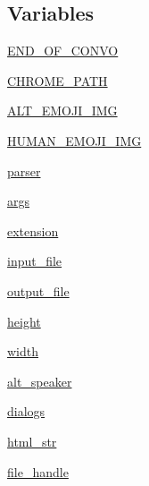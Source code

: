 \subsection*{Variables}
\begin{DoxyCompactItemize}
\item 
\hyperlink{namespaceparlai_1_1scripts_1_1convo__render_a186fc1cd3b5dd1020b696e3be2603c50}{E\+N\+D\+\_\+\+O\+F\+\_\+\+C\+O\+N\+VO}
\item 
\hyperlink{namespaceparlai_1_1scripts_1_1convo__render_acb4e8a35b4d515d9b39c046e912d2062}{C\+H\+R\+O\+M\+E\+\_\+\+P\+A\+TH}
\item 
\hyperlink{namespaceparlai_1_1scripts_1_1convo__render_ac3b8adcfe45607c534410d9c58c1a5f9}{A\+L\+T\+\_\+\+E\+M\+O\+J\+I\+\_\+\+I\+MG}
\item 
\hyperlink{namespaceparlai_1_1scripts_1_1convo__render_abdfd57c616188c807378cdd5ac001d47}{H\+U\+M\+A\+N\+\_\+\+E\+M\+O\+J\+I\+\_\+\+I\+MG}
\item 
\hyperlink{namespaceparlai_1_1scripts_1_1convo__render_a295851512271556f39c59b047dfbc8fc}{parser}
\item 
\hyperlink{namespaceparlai_1_1scripts_1_1convo__render_a784f93916e4d1bdb5c70adbfb1e29e69}{args}
\item 
\hyperlink{namespaceparlai_1_1scripts_1_1convo__render_ad4908cb1d2c44e6105115f3c09eb3a55}{extension}
\item 
\hyperlink{namespaceparlai_1_1scripts_1_1convo__render_a708724a5430d3e0236e76dc23ed66801}{input\+\_\+file}
\item 
\hyperlink{namespaceparlai_1_1scripts_1_1convo__render_ad3c1d6fa9a8463d68b415f7a995db518}{output\+\_\+file}
\item 
\hyperlink{namespaceparlai_1_1scripts_1_1convo__render_a3ea95c859b230a646a5c6fe5b4586b67}{height}
\item 
\hyperlink{namespaceparlai_1_1scripts_1_1convo__render_a9781c43527eb370030ea6f1cafca6a3a}{width}
\item 
\hyperlink{namespaceparlai_1_1scripts_1_1convo__render_a516a38b04ed5b7cf0c03ed2ea0e99d46}{alt\+\_\+speaker}
\item 
\hyperlink{namespaceparlai_1_1scripts_1_1convo__render_a7ee93e248f976c4982901e675c041076}{dialogs}
\item 
\hyperlink{namespaceparlai_1_1scripts_1_1convo__render_a501f1775e79b007a5b49bd1d053b4c07}{html\+\_\+str}
\item 
\hyperlink{namespaceparlai_1_1scripts_1_1convo__render_aaf6f8cf81ac771e9724478dd77c5b82b}{file\+\_\+handle}

\end{DoxyCompactItemize}

